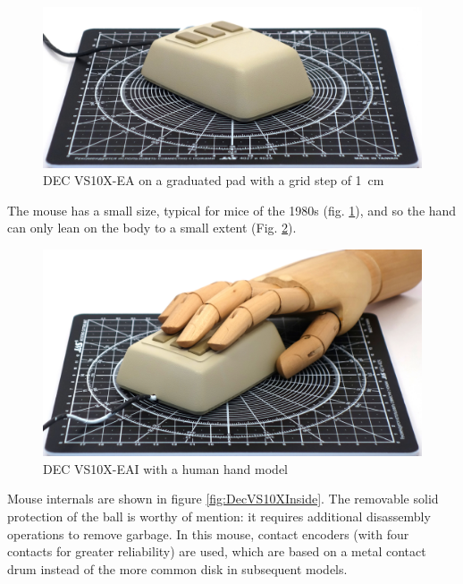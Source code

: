 \documentclass[11pt, a4paper]{article}
\begin{document}
\begin{figure}[h]
    \centering
    \includegraphics[scale=0.7]{1983_dec_vs10x_ea_mouse/size_30.jpg}
    \caption{DEC VS10X-EA on a graduated pad with a grid step of 1~cm}
    \label{fig:DecVS10XSize}
\end{figure}

The mouse has a small size, typical for mice of the 1980s (fig. \ref{fig:DecVS10XSize}), and so the hand can only lean on the body to a small extent (Fig. \ref{fig:DecVS10XHand}).
\begin{figure}[h]
    \centering
    \includegraphics[scale=0.7]{1983_dec_vs10x_ea_mouse/hand_30.jpg}
    \caption{DEC VS10X-EAI with a human hand model}
    \label{fig:DecVS10XHand}
\end{figure}

Mouse internals are shown in figure \ref{fig:DecVS10XInside}. The removable solid protection of the ball is worthy of mention: it requires additional disassembly operations to remove garbage. In this mouse, contact encoders (with four contacts for greater reliability) are used, which are based on a metal contact drum instead of the more common disk in subsequent models.

~
\end{document}
